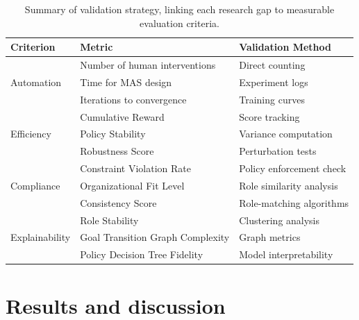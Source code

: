 \documentclass[pdflatex,sn-mathphys-num]{sn-jnl}%
\theoremstyle{thmstyleone}%
\theoremstyle{thmstyletwo}%
\theoremstyle{thmstylethree}%
\begin{document}

\begin{table}[h!]
    \centering
    \begin{tabular}{|l|l|l|}
        \hline
        \textbf{Criterion}              & \textbf{Metric}                  & \textbf{Validation Method} \\
        \hline
        \multirow{3}{*}{Automation}     & Number of human interventions    & Direct counting            \\
                                        & Time for MAS design              & Experiment logs            \\
                                        & Iterations to convergence        & Training curves            \\
        \hline
        \multirow{3}{*}{Efficiency}     & Cumulative Reward                & Score tracking             \\
                                        & Policy Stability                 & Variance computation       \\
                                        & Robustness Score                 & Perturbation tests         \\
        \hline
        \multirow{3}{*}{Compliance}     & Constraint Violation Rate        & Policy enforcement check   \\
                                        & Organizational Fit Level         & Role similarity analysis   \\
                                        & Consistency Score                & Role-matching algorithms   \\
        \hline
        \multirow{3}{*}{Explainability} & Role Stability                   & Clustering analysis        \\
                                        & Goal Transition Graph Complexity & Graph metrics              \\
                                        & Policy Decision Tree Fidelity    & Model interpretability     \\
        \hline
    \end{tabular}
    \caption{Summary of validation strategy, linking each research gap to measurable evaluation criteria.}
\end{table}





\section{Results and discussion} \label{sec:results}
\end{document}
